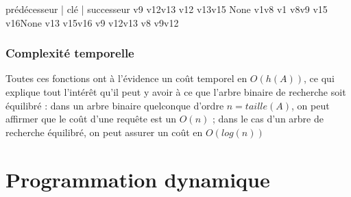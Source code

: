 \documentclass[letterpaper,10pt,english]{jupyterBook}
\begin{document}
\begin{sphinxVerbatimInput}

\begin{sphinxVerbatim}[commandchars=\\\{\}]
   
    \PYG{p}{[}\PYG{p}{]}\PYG{p}{[}\PYG{p}{]}\PYG{p}{[}\PYG{p}{]}
\end{sphinxVerbatim}
\end{sphinxVerbatimInput}
\begin{sphinxVerbatimOutput}

\begin{sphinxVerbatim}[commandchars=\\\{\}]
prédécesseur | clé | successeur 
	v9 \PYGZlt{} v12\PYGZlt{}v13
	v12 \PYGZlt{} v13\PYGZlt{}v15
	None \PYGZlt{} v1\PYGZlt{}v8
	v1 \PYGZlt{} v8\PYGZlt{}v9
	v15 \PYGZlt{} v16\PYGZlt{}None
	v13 \PYGZlt{} v15\PYGZlt{}v16
	v9 \PYGZlt{} v12\PYGZlt{}v13
	v8 \PYGZlt{} v9\PYGZlt{}v12
\end{sphinxVerbatim}
\end{sphinxVerbatimOutput}


\subsection{Complexité temporelle}
\label{\detokenize{notebooks/ABR/ABR:complexite-temporelle}}
\sphinxAtStartPar
Toutes ces fonctions ont à l’évidence un coût temporel en \(O(h(A))\), ce qui explique tout l’intérêt qu’il peut y avoir à ce que l’arbre binaire de recherche soit équilibré : dans un arbre binaire quelconque d’ordre \(n = taille(A)\), on peut affirmer que le coût d’une requête est un \(O(n)\) ; dans le cas d’un arbre de recherche équilibré, on peut assurer un coût en \(O(log(n))\)


\chapter{Programmation dynamique}
\label{\detokenize{notebooks/dynamicProgramming/ProgrammationDynamique:programmation-dynamique}}\label{\detokenize{notebooks/dynamicProgramming/ProgrammationDynamique::doc}}
\end{document}
